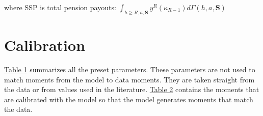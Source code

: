 \documentclass[12pt,a4paper]{article}
\begin{document}
where SSP is total pension payouts: $\int_{h \ge R, a, \textbf{S}}y^R(\kappa_{R-1})d\Gamma(h,a,\textbf{S})$
\


%
%
%
% 
%


\section{Calibration} 

\hspace*{6mm} \hyperref[fig:presetparameters]{Table 1} summarizes all the preset parameters. These parameters are not used to match moments from the model to data moments. They are taken straight from the data or from values used in the literature. \hyperref[fig:internalparameters]{Table 2}  contains the moments that are calibrated with the model so that the model generates moments that match the data.
\end{document}
